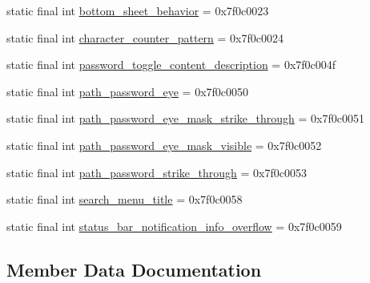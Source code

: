 \begin{DoxyCompactItemize}
\item 
static final int \mbox{\hyperlink{classandroid_1_1support_1_1design_1_1R_1_1string_a1c6d2a516e05169df1423d2d8344a239}{bottom\+\_\+sheet\+\_\+behavior}} = 0x7f0c0023
\item 
static final int \mbox{\hyperlink{classandroid_1_1support_1_1design_1_1R_1_1string_ab455b3a5274912c418baa4c47031532e}{character\+\_\+counter\+\_\+pattern}} = 0x7f0c0024
\item 
static final int \mbox{\hyperlink{classandroid_1_1support_1_1design_1_1R_1_1string_a4527efd2dc09f2ef14dc5d29885af2d7}{password\+\_\+toggle\+\_\+content\+\_\+description}} = 0x7f0c004f
\item 
static final int \mbox{\hyperlink{classandroid_1_1support_1_1design_1_1R_1_1string_aed1c555d135bf6222bcd81421426dc29}{path\+\_\+password\+\_\+eye}} = 0x7f0c0050
\item 
static final int \mbox{\hyperlink{classandroid_1_1support_1_1design_1_1R_1_1string_a29a5c3f687b185da43894e42ce7815b4}{path\+\_\+password\+\_\+eye\+\_\+mask\+\_\+strike\+\_\+through}} = 0x7f0c0051
\item 
static final int \mbox{\hyperlink{classandroid_1_1support_1_1design_1_1R_1_1string_a13989fd072bdc21662e0280689488412}{path\+\_\+password\+\_\+eye\+\_\+mask\+\_\+visible}} = 0x7f0c0052
\item 
static final int \mbox{\hyperlink{classandroid_1_1support_1_1design_1_1R_1_1string_abc8635142311e1011a50dd2be868ce34}{path\+\_\+password\+\_\+strike\+\_\+through}} = 0x7f0c0053
\item 
static final int \mbox{\hyperlink{classandroid_1_1support_1_1design_1_1R_1_1string_a5b51cc800abfd3edfc464432c67dade9}{search\+\_\+menu\+\_\+title}} = 0x7f0c0058
\item 
static final int \mbox{\hyperlink{classandroid_1_1support_1_1design_1_1R_1_1string_ae7e600aba7d20d01b5e3b4ccc3847bc9}{status\+\_\+bar\+\_\+notification\+\_\+info\+\_\+overflow}} = 0x7f0c0059
\end{DoxyCompactItemize}


\subsection{Member Data Documentation}
\mbox{\label{classandroid_1_1support_1_1design_1_1R_1_1string_ae94186933fbea8b608ced5c610548d2e}} 
